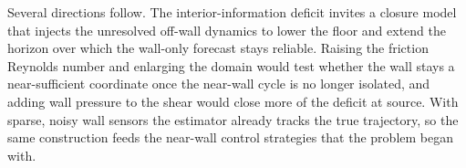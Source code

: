 \documentclass[pdflatex,sn-basic]{sn-jnl}
\theoremstyle{thmstyleone}%
\theoremstyle{thmstyletwo}%
\theoremstyle{thmstylethree}%
\begin{document}
Several directions follow. The interior-information deficit invites a closure model
that injects the unresolved off-wall dynamics to lower the floor and extend the horizon
over which the wall-only forecast stays reliable. Raising the friction Reynolds number
and enlarging the domain would test whether the wall stays a near-sufficient coordinate
once the near-wall cycle is no longer isolated, and adding wall pressure to the shear
would close more of the deficit at source. With sparse, noisy wall sensors the
estimator already tracks the true trajectory, so the same construction feeds the
near-wall control strategies that the problem began with.


\end{document}
